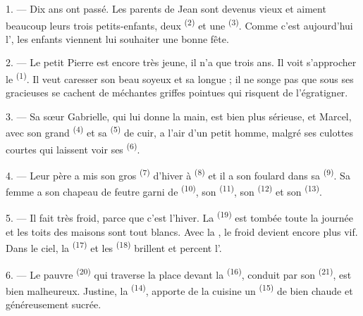 \VUsaut{3.0mm}

1. --- Dix ans ont passé. Les parents de Jean sont devenus vieux et aiment
beaucoup leurs trois petits-enfants, deux 
\textsuperscript{(2)} et une  \textsuperscript{(3)}. Comme
c'est aujourd'hui l', les enfants viennent
lui souhaiter une bonne fête.

2. --- Le petit Pierre est encore très jeune, il n'a que trois ans. Il voit
s'approcher le  \textsuperscript{(1)}. Il veut caresser son beau
 soyeux et sa longue ; il ne songe pas que sous
ses gracieuses  se cachent de méchantes griffes pointues qui
risquent de l'égratigner.

3. --- Sa sœur Gabrielle, qui lui donne la main, est bien plus sérieuse, et
Marcel, avec son grand  \textsuperscript{(4)} et sa
 \textsuperscript{(5)} de cuir, a l'air d'un petit homme,
malgré ses culottes courtes qui laissent voir ses 
\textsuperscript{(6)}.

4. --- Leur père a mis son gros  \textsuperscript{(7)}
d'hiver à  \textsuperscript{(8)} et il a son foulard
dans sa  \textsuperscript{(9)}. Sa femme a son chapeau de feutre
garni de  \textsuperscript{(10)}, son 
\textsuperscript{(11)}, son  \textsuperscript{(12)} et son
 \textsuperscript{(13)}.

5. --- Il fait très froid, parce que c'est l'hiver. La 
\textsuperscript{(19)} est tombée toute la journée et les toits des maisons
sont tout blancs. Avec la , le froid devient encore plus vif. Dans
le ciel, la  \textsuperscript{(17)} et les 
\textsuperscript{(18)} brillent et percent l'.

\VUsaut{4.2mm}
\VUsaut{3.0mm}

6. --- Le pauvre  \textsuperscript{(20)} qui traverse la place
devant la  \textsuperscript{(16)}, conduit par son
 \textsuperscript{(21)}, est bien malheureux. Justine, la
 \textsuperscript{(14)}, apporte de la cuisine un
 \textsuperscript{(15)} de  bien chaude et
généreusement sucrée.

